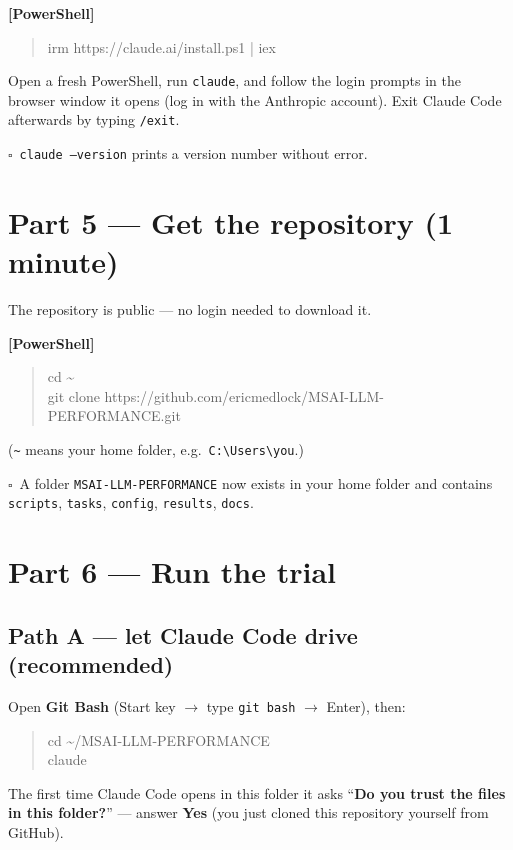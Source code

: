 \documentclass[11pt]{article}
\newcommand{\cmd}[1]{\colorbox{cmdbg}{\texttt{#1}}}
\newenvironment{cmdblock}{\begin{quote}\small\begin{ttfamily}}{\end{ttfamily}\end{quote}}
\newcommand{\checkbox}{$\square$~}
\begin{document}
\textbf{[PowerShell]}
\begin{cmdblock}
irm https://claude.ai/install.ps1 | iex
\end{cmdblock}

Open a fresh PowerShell, run \cmd{claude}, and follow the login prompts in the
browser window it opens (log in with the Anthropic account). Exit Claude Code
afterwards by typing \texttt{/exit}.

\checkbox \texttt{claude --version} prints a version number without error.

\section*{Part 5 --- Get the repository (1 minute)}

The repository is public --- no login needed to download it.

\textbf{[PowerShell]}
\begin{cmdblock}
cd \textasciitilde \\
git clone https://github.com/ericmedlock/MSAI-LLM-PERFORMANCE.git
\end{cmdblock}

(\texttt{\textasciitilde} means your home folder, e.g.\ \texttt{C:\textbackslash Users\textbackslash you}.)

\checkbox A folder \texttt{MSAI-LLM-PERFORMANCE} now exists in your home folder and
contains \texttt{scripts}, \texttt{tasks}, \texttt{config}, \texttt{results},
\texttt{docs}.

\section*{Part 6 --- Run the trial}

\subsection*{Path A --- let Claude Code drive (recommended)}

Open \textbf{Git Bash} (Start key $\rightarrow$ type \texttt{git bash} $\rightarrow$ Enter), then:

\begin{cmdblock}
cd \textasciitilde/MSAI-LLM-PERFORMANCE \\
claude
\end{cmdblock}

The first time Claude Code opens in this folder it asks
``\textbf{Do you trust the files in this folder?}'' --- answer \textbf{Yes} (you
just cloned this repository yourself from GitHub).
\end{document}
